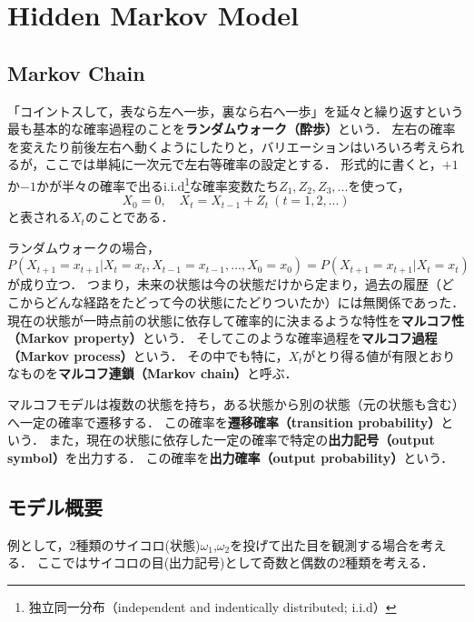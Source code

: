\section{Hidden Markov Model}

\subsection{Markov Chain}
「コイントスして，表なら左へ一歩，裏なら右へ一歩」を延々と繰り返すという最も基本的な確率過程のことを\textbf{ランダムウォーク（酔歩）}という．
左右の確率を変えたり前後左右へ動くようにしたりと，バリエーションはいろいろ考えられるが，ここでは単純に一次元で左右等確率の設定とする．
形式的に書くと，$+1$か$-1$かが半々の確率で出るi.i.d\footnote{独立同一分布（independent and indentically distributed; i.i.d）}な確率変数たち$Z_{1}, Z_{2}, Z_{3},...$を使って，
\begin{equation}
X_{0}=0, \quad X_{t} = X_{t-1} + Z_{t} \ (t=1,2,...) \label{eq:ranwark}
\end{equation}
と表される$X_{t}$のことである\cite{probability_statistics_for_programming}．

ランダムウォークの場合，
\begin{equation}
P(X_{t+1} = x_{t+1} | X_{t} = x_{t},X_{t-1} = x_{t-1}, ... , X_{0} = x_{0}) = P(X_{t+1}=x_{t+1}|X_{t} = x_{t}) \label{eq:markov}
\end{equation}
が成り立つ．
つまり，未来の状態は今の状態だけから定まり，過去の履歴（どこからどんな経路をたどって今の状態にたどりついたか）には無関係であった．
現在の状態が一時点前の状態に依存して確率的に決まるような特性を\textbf{マルコフ性（Markov property）}という．
そしてこのような確率過程を\textbf{マルコフ過程（Markov process）}という．
その中でも特に，$X_{t}$がとり得る値が有限とおりなものを\textbf{マルコフ連鎖（Markov chain）}と呼ぶ．

マルコフモデルは複数の状態を持ち，ある状態から別の状態（元の状態も含む）へ一定の確率で遷移する．
この確率を\textbf{遷移確率（transition probability）}という．
また，現在の状態に依存した一定の確率で特定の\textbf{出力記号（output symbol）}を出力する．
この確率を\textbf{出力確率（output probability）}という\cite{probability_statistics_for_programming}．

\newpage

\subsection{モデル概要}
例として，2種類のサイコロ(状態)$\omega_{1}$,$\omega_{2}$を投げて出た目を観測する場合を考える．
ここではサイコロの目(出力記号)として奇数と偶数の2種類を考える．

